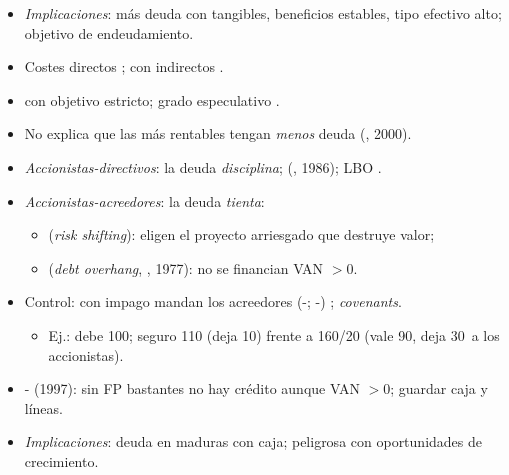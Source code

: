 \documentclass{article}
\begin{document}
\begin{columnas}
\begin{itemize}
\begin{itemize}
  \end{itemize}
\end{itemize}
\begin{itemize}
\item \emph{Implicaciones}: más deuda con tangibles, beneficios estables, tipo efectivo alto; objetivo de endeudamiento.
\end{itemize}
\begin{itemize}
\item Costes directos ; con indirectos .
\item {} con objetivo estricto; grado especulativo .
\item No explica que las más rentables tengan \emph{menos} deuda (, 2000).
\end{itemize}
\begin{itemize}
\item \emph{Accionistas-directivos}: la deuda \emph{disciplina};  (, 1986); LBO .
\item \emph{Accionistas-acreedores}: la deuda \emph{tienta}:
  \begin{itemize}
  \item {} (\emph{risk shifting}): eligen el proyecto arriesgado que destruye valor;
  \item {} (\emph{debt overhang}, , 1977): no se financian VAN $>0$.
  \end{itemize}
\item Control: con impago mandan los acreedores (-; -) ; \emph{covenants}.
  \begin{itemize}
  \item Ej.: debe 100; seguro 110 (deja 10) frente a 160/20 (vale 90, deja 30~a los accionistas).
  \end{itemize}
\item {}- (1997): sin FP bastantes no hay crédito aunque VAN $>0$; guardar caja y líneas.
\item \emph{Implicaciones}: deuda en maduras con caja; peligrosa con oportunidades de crecimiento.

\end{itemize}
\end{columnas}
\end{document}
